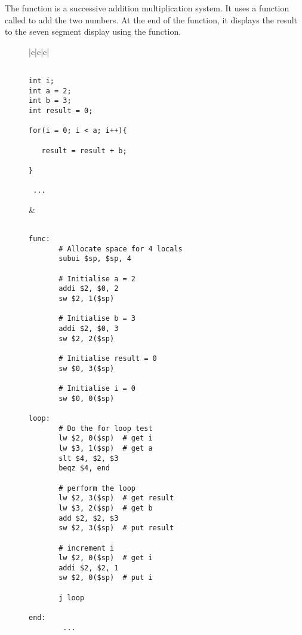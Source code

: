 The function is a successive addition multiplication system. It uses a
function called  to add the two numbers. At the end of the
function, it displays the result to the seven segment display using the
 function.

%
%
\begin{figure}[!hbtp]
\begin{center}
\begin{tabular}{|c|c|c|}
\hline
\begin{minipage}[t]{5cm}
\begin{scriptsize}
\begin{verbatim}

int i;
int a = 2;
int b = 3;
int result = 0;

for(i = 0; i < a; i++){

   result = result + b;

}

 ...

\end{verbatim}
\end{scriptsize}
\end{minipage}
&
\begin{minipage}[t]{6cm}
\begin{scriptsize}
\begin{verbatim}

func:
       # Allocate space for 4 locals
       subui $sp, $sp, 4

       # Initialise a = 2
       addi $2, $0, 2
       sw $2, 1($sp)

       # Initialise b = 3
       addi $2, $0, 3
       sw $2, 2($sp)

       # Initialise result = 0
       sw $0, 3($sp)

       # Initialise i = 0
       sw $0, 0($sp)

loop:
       # Do the for loop test
       lw $2, 0($sp)  # get i
       lw $3, 1($sp)  # get a
       slt $4, $2, $3
       beqz $4, end

       # perform the loop
       lw $2, 3($sp)  # get result
       lw $3, 2($sp)  # get b
       add $2, $2, $3
       sw $2, 3($sp)  # put result

       # increment i
       lw $2, 0($sp)  # get i
       addi $2, $2, 1
       sw $2, 0($sp)  # put i

       j loop

end:
        ...


\end{verbatim}
\end{scriptsize}
\end{minipage}
\end{tabular}
\end{center}
\end{figure}

